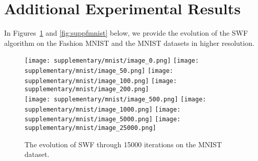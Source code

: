 





\section{Additional Experimental Results}

In Figures~\ref{fig:suppmnist} and \ref{fig:suppfmnist} below, we provide the evolution of the SWF algorithm on the Fashion MNIST and the MNIST datasets in higher resolution.

\newcommand{\picwidth}{0.15}%

\begin{figure}
\centering
\texttt{[image: supplementary/mnist/image\_0.png]}
\texttt{[image: supplementary/mnist/image\_50.png]}
\texttt{[image: supplementary/mnist/image\_100.png]}
\texttt{[image: supplementary/mnist/image\_200.png]}\\
\texttt{[image: supplementary/mnist/image\_500.png]}
\texttt{[image: supplementary/mnist/image\_1000.png]}
\texttt{[image: supplementary/mnist/image\_5000.png]}
\texttt{[image: supplementary/mnist/image\_25000.png]}
\caption{The evolution of SWF through 15000 iterations on the MNIST dataset.}
\label{fig:suppmnist}
\end{figure}

